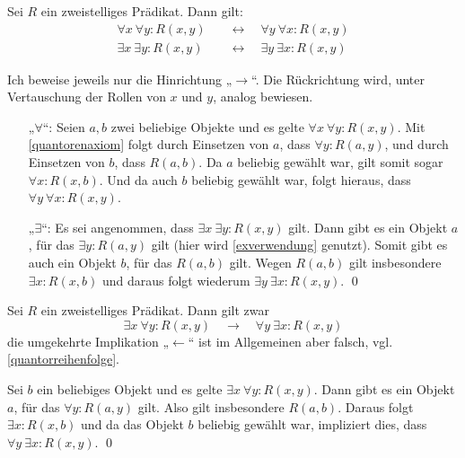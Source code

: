 \begin{satz} \label{quantorentausch}
    Sei $R$ ein zweistelliges Prädikat. Dann gilt:
    \begin{align*}
        \forall x\ \forall y: R(x,y) \quad &\leftrightarrow\quad \forall y\ \forall x: R(x,y) \\
        \exists x\ \exists y: R(x,y) \quad &\leftrightarrow\quad  \exists y\ \exists x: R(x,y)
    \end{align*}
\end{satz}


\begin{bew}
    Ich beweise jeweils nur die Hinrichtung „$\to$“. Die Rückrichtung wird, unter Vertauschung der Rollen von $x$ und $y$, analog bewiesen.
    \begin{itemize}
        \item[„$\forall$“:] Seien $a,b$ zwei beliebige Objekte und es gelte $\forall x\ \forall y: R(x,y)$. Mit \cref{quantorenaxiom} folgt durch Einsetzen von $a$, dass $\forall y: R(a,y)$, und durch Einsetzen von $b$, dass $R(a,b)$. Da $a$ beliebig gewählt war, gilt somit sogar $\forall x: R(x,b)$. Und da auch $b$ beliebig gewählt war, folgt hieraus, dass $\forall y\ \forall x: R(x,y)$.
        \item[„$\exists$“:] Es sei angenommen, dass $\exists x\ \exists y: R(x,y)$ gilt. Dann gibt es ein Objekt $a$, für das $\exists y: R(a,y)$ gilt (hier wird \cref{exverwendung} genutzt). Somit gibt es auch ein Objekt $b$, für das $R(a,b)$ gilt. Wegen $R(a,b)$ gilt insbesondere $\exists x: R(x,b)$ und daraus folgt wiederum $\exists y\ \exists x: R(x,y)$. \qed
    \end{itemize}
\end{bew}


\begin{satz}
    Sei $R$ ein zweistelliges Prädikat. Dann gilt zwar
        \[ \exists x\ \forall y: R(x,y) \quad\to\quad \forall y\ \exists x: R(x,y) \]  
    die umgekehrte Implikation „$\leftarrow$“ ist im Allgemeinen aber falsch, vgl. \cref{quantorreihenfolge}.
\end{satz}


\begin{bew}
    Sei $b$ ein beliebiges Objekt und es gelte $\exists x\ \forall y: R(x,y)$. Dann gibt es ein Objekt $a$, für das $\forall y: R(a,y)$ gilt. Also gilt insbesondere $R(a,b)$. Daraus folgt $\exists x: R(x,b)$ und da das Objekt $b$ beliebig gewählt war, impliziert dies, dass $\forall y\ \exists x: R(x,y)$. \qed
\end{bew}




